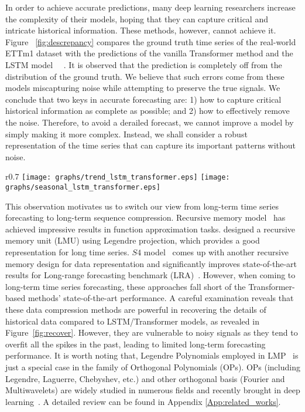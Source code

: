 \documentclass{article}
\begin{document}
In order to achieve accurate predictions, many deep learning researchers increase the complexity of their models, hoping that they can capture critical and intricate historical information. These methods, however, cannot achieve it. Figure ~\ref{fig:descrepancy} compares the ground truth time series of the real-world ETTm1 dataset with the predictions of the vanilla Transformer method and the LSTM model~\cite{attention_is_all_you_need,hochreiter1997long}~ \cite{ haoyietal-informer-2021}. It is observed that the prediction is completely off from the distribution of the ground truth. We believe that such errors come from these models miscapturing noise while attempting to preserve the true signals. We conclude that two keys in accurate forecasting are: 1) how to capture critical historical information as complete as possible; and 2) how to effectively remove the noise. 
Therefore, to avoid a derailed forecast, we cannot improve a model by simply making it more complex. Instead, we shall consider a robust representation of the time series that can capture its important patterns without noise.
\begin{wrapfigure}[12]{r}{0.7\textwidth}
\vskip -0.12in
\centering
\texttt{[image: graphs/trend\_lstm\_transformer.eps]}
\texttt{[image: graphs/seasonal\_lstm\_transformer.eps]}
\vskip -0.10in
\caption{The discrepancy between ground truth and forecasting output from vanilla Transformer and LSTM on a real-world ETTh1 dataset Left: trend shift. Right: seasonal shift.}\label{fig:descrepancy}
\vskip -0.20in
\end{wrapfigure}

This observation motivates us to switch our view from long-term time series forecasting to long-term sequence compression. Recursive memory model~\cite{LMU,S4,LSSL,Hippo} has achieved impressive results in function approximation tasks. \cite{LMU} designed a recursive memory unit (LMU) using Legendre projection, which provides a good representation for long time series. $S4$ model~\cite{S4} comes up with another recursive memory design for data representation and significantly improves state-of-the-art results for Long-range forecasting benchmark (LRA)~\cite{LRA}. However, when coming to long-term time series forecasting, these approaches fall short of the Transformer-based methods' state-of-the-art performance. A careful examination reveals that these data compression methods are powerful in recovering the details of historical data compared to LSTM/Transformer models, as revealed in Figure~\ref{fig:recover}. However, they are vulnerable to noisy signals as they tend to overfit all the spikes in the past, leading to limited long-term forecasting performance. It is worth noting that, Legendre Polynomials employed in LMP~\cite{LMU} is just a special case in the family of Orthogonal Polynomials (OPs). OPs (including Legendre, Laguerre, Chebyshev, etc.) and other orthogonal basis (Fourier and Multiwavelets) are widely studied in numerous fields and recently brought in deep learning~\cite{wang2018multilevel,Multiwavelet-based-Operator-Learning,FedFormer,LMU,Hippo}. A detailed review can be found in Appendix \ref{App:related_works}.
\end{document}

